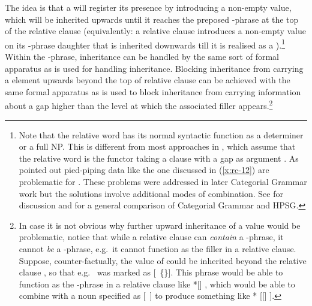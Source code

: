 \documentclass[output=paper
                ,modfonts
                ,nonflat
	        ,collection
	        ,collectionchapter
	        ,collectiontoclongg
 	        ,biblatex
                ,babelshorthands
                ,newtxmath
                ,draftmode
                ,colorlinks, citecolor=brown
]{./langsci/langscibook}
\begin{document}
The idea is that a  will register its presence by introducing a non-empty
 value, which will be inherited upwards until it reaches the preposed
-phrase at the top of the relative clause (equivalently: a relative clause
introduces a non-empty  value on its -phrase daughter that is inherited downwards till it is
realised as a ).\footnote{%
  Note that the relative word has its normal syntactic function as a
  determiner or a full NP. This is different from most approaches in , which assume that the relative word is the functor taking a clause
  with a gap as argument \citep{Steedman97a}. As \citet{Pollard88a}
  pointed out pied-piping data like the one discussed in (\ref{x:rc-12})
  are problematic for . These problems were addressed in
  later Categorial Grammar work but the solutions involve additional modes of
  combination. See  for discussion and  for
  a general comparison of Categorial Grammar and HPSG.}
Within the -phrase,  inheritance can
be handled by the same sort of formal apparatus as is used for handling 
inheritance. Blocking  inheritance from carrying a  element
upwards beyond the top of relative clause can be achieved with the same formal apparatus
as is used to block  inheritance from carrying information about a gap
higher than the level at which the associated filler appears.\footnote{In case it is not
  obvious why further upward inheritance of a  value would be problematic,
  notice that while a relative clause can \emph{contain} a -phrase, it cannot
  \emph{be} a -phrase, e.g.\ it cannot function as the filler in a relative
  clause. Suppose, counter-factually, the  value of  could be inherited
  beyond the relative clause , so that e.g.\  was marked as [~\{\}]. This phrase would be able to
  function as the -phrase in a relative clause like *[] , which would be able to combine with a noun specified as
  [~] to produce something like * [[] ].}
\end{document}
